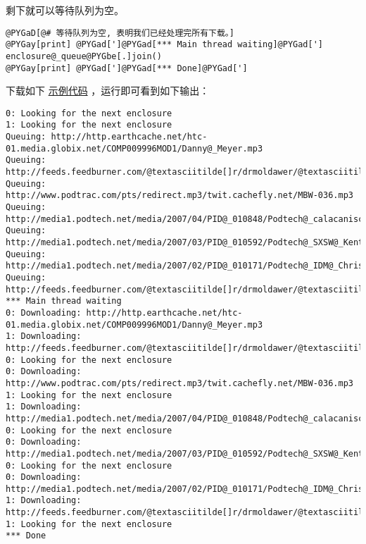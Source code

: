\documentclass[a4paper,10pt,english]{manual}
\begin{document}
剩下就可以等待队列为空。

\begin{Verbatim}[commandchars=@\[\]]
@PYGaD[@# 等待队列为空, 表明我们已经处理完所有下载。]
@PYGay[print] @PYGad[']@PYGad[*** Main thread waiting]@PYGad[']
enclosure@_queue@PYGbe[.]join()
@PYGay[print] @PYGad[']@PYGad[*** Done]@PYGad[']
\end{Verbatim}

下载如下 \href{http://www.doughellmann.com/PyMOTW/fetch\_podcasts.py}{示例代码} ，运行即可看到如下输出：

\begin{Verbatim}[commandchars=@\[\]]
0: Looking for the next enclosure
1: Looking for the next enclosure
Queuing: http://http.earthcache.net/htc-01.media.globix.net/COMP009996MOD1/Danny@_Meyer.mp3
Queuing: http://feeds.feedburner.com/@textasciitilde[]r/drmoldawer/@textasciitilde[]5/104445110/moldawerinthemorning@_show34@_032607.mp3
Queuing: http://www.podtrac.com/pts/redirect.mp3/twit.cachefly.net/MBW-036.mp3
Queuing: http://media1.podtech.net/media/2007/04/PID@_010848/Podtech@_calacaniscast22@_ipod.mp4
Queuing: http://media1.podtech.net/media/2007/03/PID@_010592/Podtech@_SXSW@_KentBrewster@_ipod.mp4
Queuing: http://media1.podtech.net/media/2007/02/PID@_010171/Podtech@_IDM@_ChrisOBrien2.mp3
Queuing: http://feeds.feedburner.com/@textasciitilde[]r/drmoldawer/@textasciitilde[]5/96188661/moldawerinthemorning@_show30@_022607.mp3
*** Main thread waiting
0: Downloading: http://http.earthcache.net/htc-01.media.globix.net/COMP009996MOD1/Danny@_Meyer.mp3
1: Downloading: http://feeds.feedburner.com/@textasciitilde[]r/drmoldawer/@textasciitilde[]5/104445110/moldawerinthemorning@_show34@_032607.mp3
0: Looking for the next enclosure
0: Downloading: http://www.podtrac.com/pts/redirect.mp3/twit.cachefly.net/MBW-036.mp3
1: Looking for the next enclosure
1: Downloading: http://media1.podtech.net/media/2007/04/PID@_010848/Podtech@_calacaniscast22@_ipod.mp4
0: Looking for the next enclosure
0: Downloading: http://media1.podtech.net/media/2007/03/PID@_010592/Podtech@_SXSW@_KentBrewster@_ipod.mp4
0: Looking for the next enclosure
0: Downloading: http://media1.podtech.net/media/2007/02/PID@_010171/Podtech@_IDM@_ChrisOBrien2.mp3
1: Downloading: http://feeds.feedburner.com/@textasciitilde[]r/drmoldawer/@textasciitilde[]5/96188661/moldawerinthemorning@_show30@_022607.mp3
1: Looking for the next enclosure
*** Done
\end{Verbatim}

\resetcurrentobjects
\end{document}
